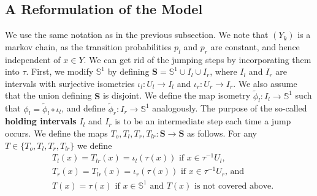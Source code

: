 \documentclass[pdftex,11pt,a4paper,oneside]{article}
\theoremstyle{plain}
\begin{document}
\subsection{A Reformulation of the Model}\label{section:A Reformulation}
We use the same notation as in the previous subsection. We note that $(Y_k)$ is a markov chain, as the transition probabilities $p_l$ and $p_r$ are constant, and hence independent of $x\in Y$. We can get rid of the jumping steps by incorporating them into $\tau$. First, we modify $\mathbb{S}^1$ by defining $\mathbf{S} = \mathbb{S}^1 \cup I_l \cup I_r$, where $I_l$ and $I_r$ are intervals with surjective isometries $\iota_l:U_l\to I_l$ and $\iota_r: U_r\to I_r$. We also assume that the union defining $\mathbf{S}$ is disjoint. We define the map isometry $\tilde{\phi}_l: I_l\to \mathbb{S}^1$ such that $\phi_l = \tilde{\phi}_l\circ \iota_l$, and define $\tilde{\phi}_r:I_r\to \mathbb{S}^1$ analogously. The purpose of the so-called \textbf{holding intervals} $I_l$ and $I_r$ is to be an intermediate step each time a jump occurs. We define the maps $T_{o},T_l,T_r,T_{lr}:\mathbf{S}\to\mathbf{S}$ as follows. For any $T \in \{T_{o},T_l,T_r,T_{lr}\}$ we define
\begin{subequations}\label{equation:HalfOfOmega}
    \begin{align}
        &T_l(x) = T_{lr}(x) = \iota_l(\tau(x)) \text{ if } x\in\tau^{-1}U_l \label{subeq:left transitions},\\
        &T_r(x) = T_{lr}(x) = \iota_r(\tau(x)) \text{ if } x\in\tau^{-1}U_r \label{subeq:right transitions}\text{, and}\\
        &T(x) = \tau(x) \text{ if } x\in\mathbb{S}^1 \text{ and $T(x)$ is not covered above}.
    \end{align}
\end{subequations}
\end{document}
